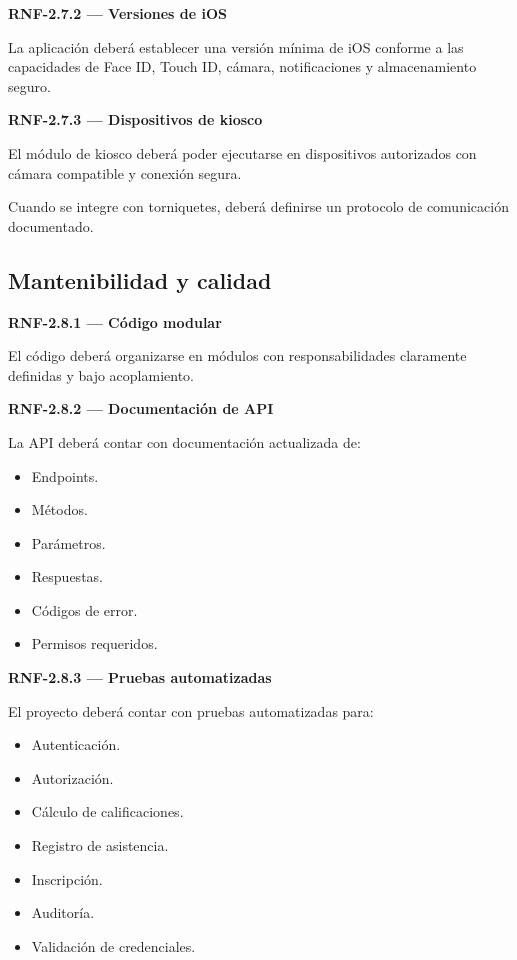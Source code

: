 \documentclass[12pt,a4paper]{article}
\newcommand{\RNF}[1]{\textbf{\color{secondary}RNF-#1}}
\newenvironment{requisito}[1]
{
\begin{center}
\begin{minipage}{0.96\textwidth}
\colorbox{requirement}{
\begin{minipage}{0.94\textwidth}
\textbf{#1}
\end{minipage}
}
\vspace{2mm}
}
{
\end{minipage}
\end{center}
}
\begin{document}
\begin{requisito}{\RNF{2.7.2} --- Versiones de iOS}
La aplicación deberá establecer una versión mínima de iOS conforme a las
capacidades de Face ID, Touch ID, cámara, notificaciones y almacenamiento seguro.
\end{requisito}

\begin{requisito}{\RNF{2.7.3} --- Dispositivos de kiosco}
El módulo de kiosco deberá poder ejecutarse en dispositivos autorizados con
cámara compatible y conexión segura.

Cuando se integre con torniquetes, deberá definirse un protocolo de comunicación
documentado.
\end{requisito}

\subsection{Mantenibilidad y calidad}

\begin{requisito}{\RNF{2.8.1} --- Código modular}
El código deberá organizarse en módulos con responsabilidades claramente
definidas y bajo acoplamiento.
\end{requisito}

\begin{requisito}{\RNF{2.8.2} --- Documentación de API}
La API deberá contar con documentación actualizada de:

\begin{itemize}[leftmargin=*]
\item Endpoints.
\item Métodos.
\item Parámetros.
\item Respuestas.
\item Códigos de error.
\item Permisos requeridos.
\end{itemize}
\end{requisito}

\begin{requisito}{\RNF{2.8.3} --- Pruebas automatizadas}
El proyecto deberá contar con pruebas automatizadas para:

\begin{itemize}[leftmargin=*]
\item Autenticación.
\item Autorización.
\item Cálculo de calificaciones.
\item Registro de asistencia.
\item Inscripción.
\item Auditoría.
\item Validación de credenciales.
\end{itemize}
\end{requisito}
\end{document}
